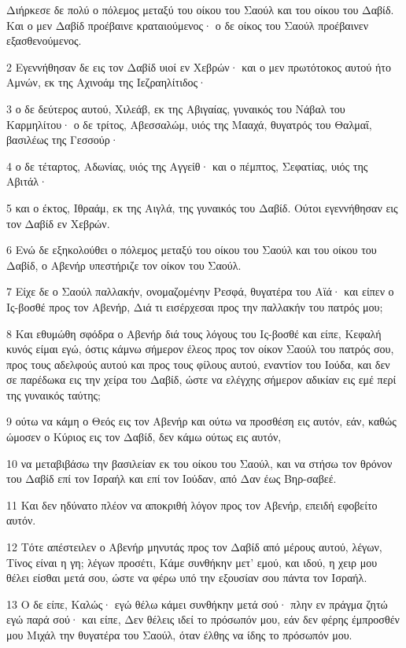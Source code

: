 \par Διήρκεσε δε πολύ ο πόλεμος μεταξύ του οίκου του Σαούλ και του οίκου του Δαβίδ. Και ο μεν Δαβίδ προέβαινε κραταιούμενος· ο δε οίκος του Σαούλ προέβαινεν εξασθενούμενος.
\par 2 Εγεννήθησαν δε εις τον Δαβίδ υιοί εν Χεβρών· και ο μεν πρωτότοκος αυτού ήτο Αμνών, εκ της Αχινοάμ της Ιεζραηλίτιδος·
\par 3 ο δε δεύτερος αυτού, Χιλεάβ, εκ της Αβιγαίας, γυναικός του Νάβαλ του Καρμηλίτου· ο δε τρίτος, Αβεσσαλώμ, υιός της Μααχά, θυγατρός του Θαλμαΐ, βασιλέως της Γεσσούρ·
\par 4 ο δε τέταρτος, Αδωνίας, υιός της Αγγείθ· και ο πέμπτος, Σεφατίας, υιός της Αβιτάλ·
\par 5 και ο έκτος, Ιθραάμ, εκ της Αιγλά, της γυναικός του Δαβίδ. Ούτοι εγεννήθησαν εις τον Δαβίδ εν Χεβρών.
\par 6 Ενώ δε εξηκολούθει ο πόλεμος μεταξύ του οίκου του Σαούλ και του οίκου του Δαβίδ, ο Αβενήρ υπεστήριζε τον οίκον του Σαούλ.
\par 7 Είχε δε ο Σαούλ παλλακήν, ονομαζομένην Ρεσφά, θυγατέρα του Αϊά· και είπεν ο Ις-βοσθέ προς τον Αβενήρ, Διά τι εισέρχεσαι προς την παλλακήν του πατρός μου;
\par 8 Και εθυμώθη σφόδρα ο Αβενήρ διά τους λόγους του Ις-βοσθέ και είπε, Κεφαλή κυνός είμαι εγώ, όστις κάμνω σήμερον έλεος προς τον οίκον Σαούλ του πατρός σου, προς τους αδελφούς αυτού και προς τους φίλους αυτού, εναντίον του Ιούδα, και δεν σε παρέδωκα εις την χείρα του Δαβίδ, ώστε να ελέγχης σήμερον αδικίαν εις εμέ περί της γυναικός ταύτης;
\par 9 ούτω να κάμη ο Θεός εις τον Αβενήρ και ούτω να προσθέση εις αυτόν, εάν, καθώς ώμοσεν ο Κύριος εις τον Δαβίδ, δεν κάμω ούτως εις αυτόν,
\par 10 να μεταβιβάσω την βασιλείαν εκ του οίκου του Σαούλ, και να στήσω τον θρόνον του Δαβίδ επί τον Ισραήλ και επί τον Ιούδαν, από Δαν έως Βηρ-σαβεέ.
\par 11 Και δεν ηδύνατο πλέον να αποκριθή λόγον προς τον Αβενήρ, επειδή εφοβείτο αυτόν.
\par 12 Τότε απέστειλεν ο Αβενήρ μηνυτάς προς τον Δαβίδ από μέρους αυτού, λέγων, Τίνος είναι η γη; λέγων προσέτι, Κάμε συνθήκην μετ' εμού, και ιδού, η χειρ μου θέλει είσθαι μετά σου, ώστε να φέρω υπό την εξουσίαν σου πάντα τον Ισραήλ.
\par 13 Ο δε είπε, Καλώς· εγώ θέλω κάμει συνθήκην μετά σού· πλην εν πράγμα ζητώ εγώ παρά σού· και είπε, Δεν θέλεις ιδεί το πρόσωπόν μου, εάν δεν φέρης έμπροσθέν μου Μιχάλ την θυγατέρα του Σαούλ, όταν έλθης να ίδης το πρόσωπόν μου.
